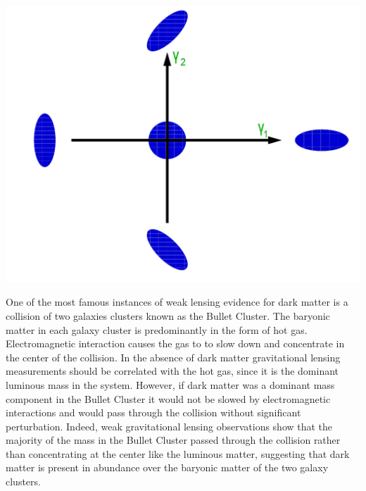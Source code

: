 \documentclass[a4paper,12pt]{article}
\begin{document}
\begin{center} \label{lensfigure}
\includegraphics[scale=0.3]{GammaOneGammaTwo.png}
\end{center}

 
One of the most famous instances of weak lensing evidence for dark matter is a collision of two galaxies clusters known as the Bullet Cluster.  The baryonic matter in each galaxy cluster is predominantly in the form of hot gas.  Electromagnetic interaction causes the gas to to slow down and concentrate in the center of the collision.  In the absence of dark matter gravitational lensing measurements should be correlated with the hot gas, since it is the dominant luminous mass in the system.  However, if dark matter was a dominant mass component in the Bullet Cluster it would not be slowed by electromagnetic interactions and would pass through the collision without significant perturbation. Indeed, weak gravitational lensing observations show that the majority of the mass in the Bullet Cluster passed through the collision rather than concentrating at the center like the luminous matter, suggesting that dark matter is present in abundance over the baryonic matter of the two galaxy clusters.  \cite{Clowe}
\end{document}
